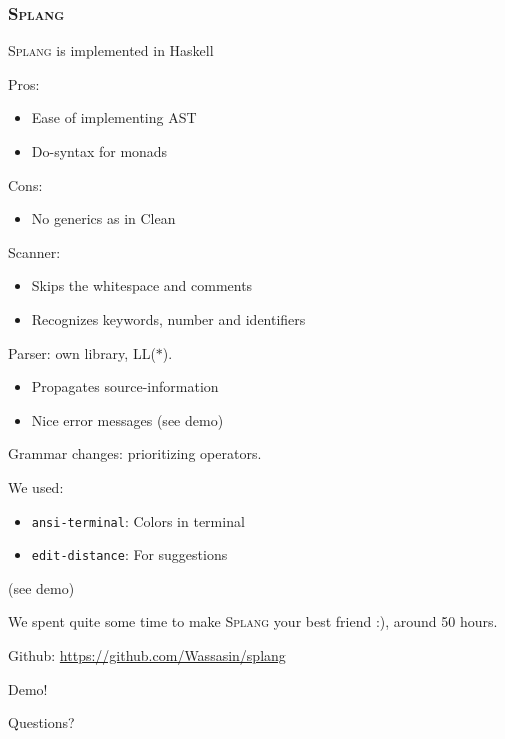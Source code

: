 \documentclass[14pt]{beamer}
\title{\splang}
\author{Wouter Geraedts \and Joshua Moerman}
\institute{Radboud Universiteit Nijmegen}
\date{}
\newcommand{\splang}{\textsc{Splang}\xspace}
\begin{document}
\begin{frame}
\titlepage
\end{frame}


\begin{frame}
\frametitle{\splang}
\splang is implemented in Haskell
\bigskip

Pros:
\begin{itemize}
	\item Ease of implementing AST
	\item Do-syntax for monads
\end{itemize}

Cons:
\begin{itemize}
	\item No generics as in Clean
\end{itemize}
\end{frame}


\begin{frame}
Scanner:
\begin{itemize}
	\item Skips the whitespace and comments
	\item Recognizes keywords, number and identifiers
\end{itemize}
\bigskip

Parser: own library, LL($\ast$).
\begin{itemize}
	\item Propagates source-information
	\item Nice error messages (see demo)
\end{itemize}
\bigskip

Grammar changes: prioritizing operators.
\end{frame}


\begin{frame}
We used:
\begin{itemize}
	\item \texttt{ansi-terminal}: Colors in terminal
	\item \texttt{edit-distance}: For suggestions
\end{itemize}
(see demo)
\bigskip

We spent quite some time to make \splang your best friend :), around 50 hours.
\bigskip

Github: \url{https://github.com/Wassasin/splang}
\end{frame}


\begin{frame}
\begin{center}
\Huge Demo!
\end{center}
\end{frame}


\begin{frame}
\begin{center}
\Huge Questions?
\end{center}
\end{frame}
\end{document}
